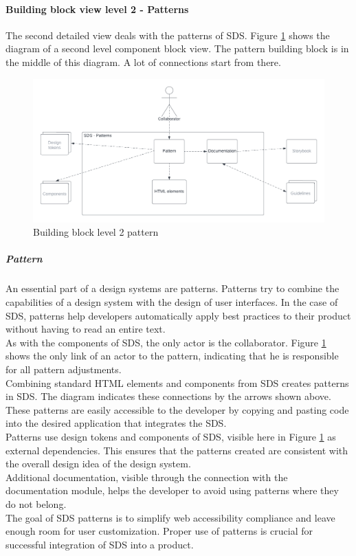 \paragraph{Building block view level 2 - Patterns}
The second detailed view deals with the patterns of SDS. Figure \ref{building_block_level_2_pattern_sds} shows the diagram of a second level component block view. The pattern building block is in the middle of this diagram. A lot of connections start from there.
\begin{figure}[htbp]
    \centerline{
    \includegraphics[width=\linewidth]{images/building_block_view_level_2_pattern.png}}
\caption{Building block level 2 pattern}
\label{building_block_level_2_pattern_sds}
\end{figure}



\subparagraph{Pattern}
An essential part of a design systems are patterns. Patterns try to combine the capabilities of a design system with the design of user interfaces. In the case of \ac{SDS}, patterns help developers automatically apply best practices to their product without having to read an entire text. \\
As with the components of SDS, the only actor is the collaborator. Figure \ref{building_block_level_2_pattern_sds} shows the only link of an actor to the pattern, indicating that he is responsible for all pattern adjustments. \\
Combining standard \ac{HTML} elements and components from SDS creates patterns in SDS. The diagram indicates these connections by the arrows shown above. These patterns are easily accessible to the developer by copying and pasting code into the desired application that integrates the \ac{SDS}. \\
Patterns use design tokens and components of \ac{SDS}, visible here in Figure \ref{building_block_level_2_pattern_sds} as external dependencies. This ensures that the patterns created are consistent with the overall design idea of the design system. \\
Additional documentation, visible through the connection with the documentation module, helps the developer to avoid using patterns where they do not belong. \\
The goal of \ac{SDS} patterns is to simplify web accessibility compliance and leave enough room for user customization. Proper use of patterns is crucial for successful integration of \ac{SDS} into a product.

